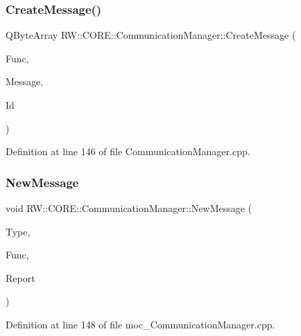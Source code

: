 \subsubsection{\texorpdfstring{Create\+Message()}{CreateMessage()}}
{\footnotesize\ttfamily Q\+Byte\+Array R\+W\+::\+C\+O\+R\+E\+::\+Communication\+Manager\+::\+Create\+Message (\begin{DoxyParamCaption}\item[{Util\+::\+Functions}]{Func,  }\item[{Q\+Byte\+Array}]{Message,  }\item[{Util\+::\+Error\+ID}]{Id }\end{DoxyParamCaption})\hspace{0.3cm}{\ttfamily [private]}}



Definition at line 146 of file Communication\+Manager.\+cpp.

\hypertarget{class_r_w_1_1_c_o_r_e_1_1_communication_manager_aae001b1bddaf9c74f20795f6954432b9}{}\label{class_r_w_1_1_c_o_r_e_1_1_communication_manager_aae001b1bddaf9c74f20795f6954432b9} 
\subsubsection{\texorpdfstring{New\+Message}{NewMessage}}
{\footnotesize\ttfamily void R\+W\+::\+C\+O\+R\+E\+::\+Communication\+Manager\+::\+New\+Message (\begin{DoxyParamCaption}\item[{Util\+::\+Message\+Receiver}]{Type,  }\item[{Util\+::\+Functions}]{Func,  }\item[{Q\+Byte\+Array}]{Report }\end{DoxyParamCaption})\hspace{0.3cm}{\ttfamily [signal]}}



Definition at line 148 of file moc\+\_\+\+Communication\+Manager.\+cpp.

\hypertarget{class_r_w_1_1_c_o_r_e_1_1_communication_manager_a3f3cff8fe51bc3eeb7d93d22e5061c06}{}\label{class_r_w_1_1_c_o_r_e_1_1_communication_manager_a3f3cff8fe51bc3eeb7d93d22e5061c06} 
